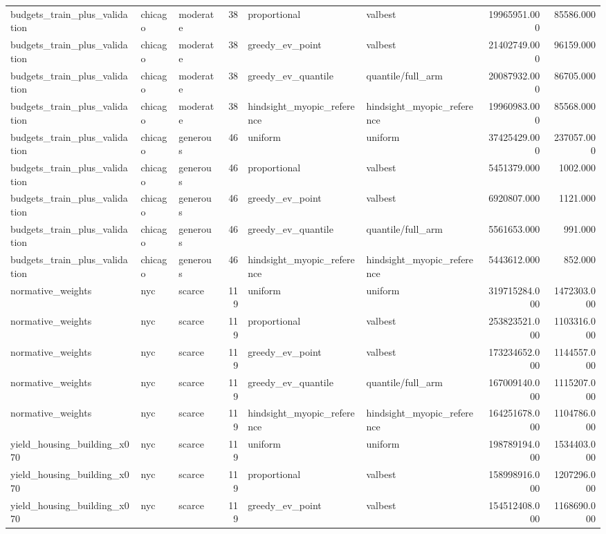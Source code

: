 \begin{tabular}{lllrllrr}
budgets\_train\_plus\_validation & chicago & moderate & 38 & proportional & valbest & 19965951.000 & 85586.000 \\
budgets\_train\_plus\_validation & chicago & moderate & 38 & greedy\_ev\_point & valbest & 21402749.000 & 96159.000 \\
budgets\_train\_plus\_validation & chicago & moderate & 38 & greedy\_ev\_quantile & quantile/full\_arm & 20087932.000 & 86705.000 \\
budgets\_train\_plus\_validation & chicago & moderate & 38 & hindsight\_myopic\_reference & hindsight\_myopic\_reference & 19960983.000 & 85568.000 \\
budgets\_train\_plus\_validation & chicago & generous & 46 & uniform & uniform & 37425429.000 & 237057.000 \\
budgets\_train\_plus\_validation & chicago & generous & 46 & proportional & valbest & 5451379.000 & 1002.000 \\
budgets\_train\_plus\_validation & chicago & generous & 46 & greedy\_ev\_point & valbest & 6920807.000 & 1121.000 \\
budgets\_train\_plus\_validation & chicago & generous & 46 & greedy\_ev\_quantile & quantile/full\_arm & 5561653.000 & 991.000 \\
budgets\_train\_plus\_validation & chicago & generous & 46 & hindsight\_myopic\_reference & hindsight\_myopic\_reference & 5443612.000 & 852.000 \\
normative\_weights & nyc & scarce & 119 & uniform & uniform & 319715284.000 & 1472303.000 \\
normative\_weights & nyc & scarce & 119 & proportional & valbest & 253823521.000 & 1103316.000 \\
normative\_weights & nyc & scarce & 119 & greedy\_ev\_point & valbest & 173234652.000 & 1144557.000 \\
normative\_weights & nyc & scarce & 119 & greedy\_ev\_quantile & quantile/full\_arm & 167009140.000 & 1115207.000 \\
normative\_weights & nyc & scarce & 119 & hindsight\_myopic\_reference & hindsight\_myopic\_reference & 164251678.000 & 1104786.000 \\
yield\_housing\_building\_x070 & nyc & scarce & 119 & uniform & uniform & 198789194.000 & 1534403.000 \\
yield\_housing\_building\_x070 & nyc & scarce & 119 & proportional & valbest & 158998916.000 & 1207296.000 \\
yield\_housing\_building\_x070 & nyc & scarce & 119 & greedy\_ev\_point & valbest & 154512408.000 & 1168690.000 \\

\end{tabular}
